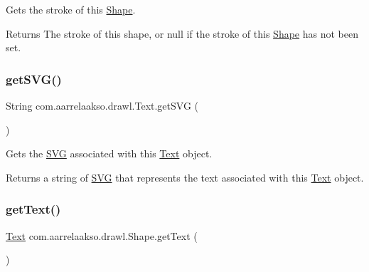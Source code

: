 Gets the stroke of this \hyperlink{classcom_1_1aarrelaakso_1_1drawl_1_1_shape}{Shape}. 

\begin{DoxyReturn}{Returns}
The stroke of this shape, or null if the stroke of this \hyperlink{classcom_1_1aarrelaakso_1_1drawl_1_1_shape}{Shape} has not been set. 
\end{DoxyReturn}
\mbox{\label{classcom_1_1aarrelaakso_1_1drawl_1_1_text_ab1a6091b007ea4da41de26bc8c6ea021}} 
\subsubsection{\texorpdfstring{get\+S\+V\+G()}{getSVG()}}
{\footnotesize\ttfamily String com.\+aarrelaakso.\+drawl.\+Text.\+get\+S\+VG (\begin{DoxyParamCaption}{ }\end{DoxyParamCaption})}



Gets the \hyperlink{classcom_1_1aarrelaakso_1_1drawl_1_1_s_v_g}{S\+VG} associated with this \hyperlink{classcom_1_1aarrelaakso_1_1drawl_1_1_text}{Text} object. 

\begin{DoxyReturn}{Returns}
a string of \hyperlink{classcom_1_1aarrelaakso_1_1drawl_1_1_s_v_g}{S\+VG} that represents the text associated with this \hyperlink{classcom_1_1aarrelaakso_1_1drawl_1_1_text}{Text} object. 
\end{DoxyReturn}
\mbox{\label{classcom_1_1aarrelaakso_1_1drawl_1_1_shape_a6f876978d4102974fedc5b41c93c7b26}} 
\subsubsection{\texorpdfstring{get\+Text()}{getText()}}
{\footnotesize\ttfamily \hyperlink{classcom_1_1aarrelaakso_1_1drawl_1_1_text}{Text} com.\+aarrelaakso.\+drawl.\+Shape.\+get\+Text (\begin{DoxyParamCaption}{ }\end{DoxyParamCaption})\hspace{0.3cm}{\ttfamily [inherited]}}



